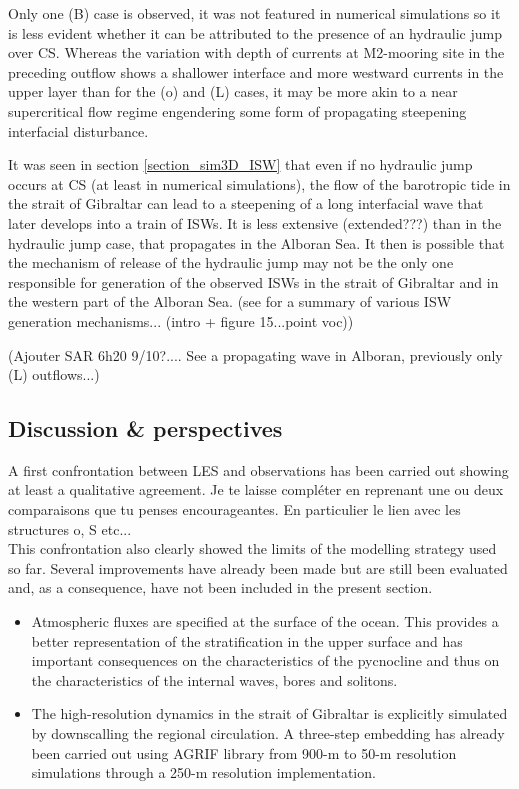 Only one (B) case is observed, it was not featured in numerical simulations so it is less evident whether it can be attributed to the presence of an hydraulic jump over CS. Whereas the variation with depth of currents at M2-mooring site in the preceding outflow shows a shallower interface and more westward currents in the upper layer than for the (o) and (L) cases, it may be more akin to a near supercritical flow regime engendering some form of propagating steepening interfacial disturbance.

It was seen in section \ref{section_sim3D_ISW} that even if no hydraulic jump occurs at CS (at least in numerical simulations), the flow of the barotropic tide in the strait of Gibraltar can lead to a steepening of a long interfacial wave that later develops into a train of ISWs. \color{blue} It is less extensive (extended???) than in the hydraulic jump case, that propagates in the Alboran Sea. \color{black} It then is possible that the mechanism of release of the hydraulic jump may not be the only one responsible for generation of the observed ISWs in the strait of Gibraltar and in the western part of the Alboran Sea.  \color{green}(see \citet{chen_2017} for a summary of various ISW generation mechanisms... (intro + figure 15...point voc)) 

(Ajouter SAR 6h20 9/10?.... See a propagating wave in Alboran, previously only (L) outflows...)\color{black}

\color{blue}
\subsection{Discussion \& perspectives}
A first confrontation between LES and observations has been carried out showing at least a qualitative agreement.  \color{green}Je te laisse compléter en reprenant une ou deux comparaisons que tu penses encourageantes. En particulier le lien avec les structures o, S etc...\\
\color{blue}This confrontation also clearly showed the limits of the modelling strategy used so far. Several improvements have already been made but are still been evaluated and, as a consequence, have not been included in the present section. 
\begin{itemize}
\item Atmospheric fluxes are specified at the surface of the ocean.  This provides a better representation of the stratification in the upper surface and has important consequences on the characteristics of the pycnocline and thus on the characteristics of the internal waves, bores and solitons.
\item The high-resolution dynamics in the strait of Gibraltar is explicitly simulated by downscalling the regional circulation. A three-step embedding has already been carried out using AGRIF library from 900-m to 50-m resolution simulations through a 250-m resolution implementation.
\end{itemize}
 \color{black}
\color{black}

